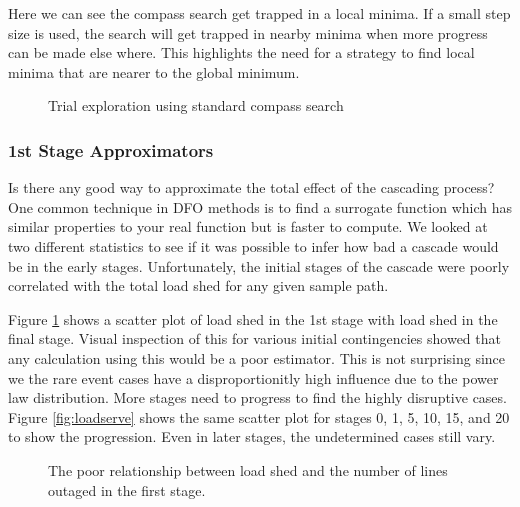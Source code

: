 


Here we can see the compass search get trapped in a local minima.  If a small step size is used, the search will get trapped in nearby minima when more progress can be made else where.  This highlights the need for a strategy to find local minima that are nearer to the global minimum.
\begin{figure}
\centering

\caption{Trial exploration using standard compass search}
\end{figure}








\subsubsection*{1st Stage Approximators}
Is there any good way to approximate the total effect of the cascading process?  One common technique in DFO methods is to find a surrogate function which has similar properties to your real function but is faster to compute.  We looked at two different statistics to see if it was possible to infer how bad a cascade would be in the early stages.  Unfortunately, the initial stages of the cascade were poorly correlated with the total load shed for any given sample path.

Figure \ref{fig:first} shows a scatter plot of load shed in the 1st stage with load shed in the final stage.
Visual inspection of this for various initial contingencies showed that any calculation using this would be a poor estimator.  This is not surprising since we the rare event cases have a disproportionitly high influence due to the power law distribution.  More stages need to progress to find the highly disruptive cases.  Figure \ref{fig:loadserve} shows the same scatter plot for stages 0, 1, 5, 10, 15, and 20 to show the progression.  Even in later stages, the undetermined cases still vary.

\begin{figure}
\centering

\caption{The poor relationship between load shed and the number of lines outaged in the first stage.}
\label{fig:first}
\end{figure}


